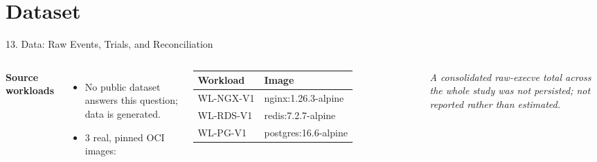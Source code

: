 \documentclass[aspectratio=169, 11pt]{beamer}
\begin{document}
\section{Dataset}
\begin{frame}{13. Data: Raw Events, Trials, and Reconciliation}
    \footnotesize
    \begin{columns}[T]
        \textbf{Source workloads}
        \begin{itemize}\setlength{\itemsep}{2pt}
            \item No public dataset answers this question; data is generated.
            \item 3 real, pinned OCI images:
        \end{itemize}
        \begin{table}
            \centering\scriptsize
            \begin{tabular}{ll}
                \toprule
                \textbf{Workload} & \textbf{Image} \\
                \midrule
                WL-NGX-V1 & nginx:1.26.3-alpine \\
                WL-RDS-V1 & redis:7.2.7-alpine \\
                WL-PG-V1 & postgres:16.6-alpine \\
                \bottomrule
            \end{tabular}
        \end{table}
        \vspace{0.1cm}
        \scriptsize\textit{A consolidated raw-execve total across the whole
        study was not persisted; not reported rather than estimated.}


\end{columns}
\end{frame}
\end{document}
